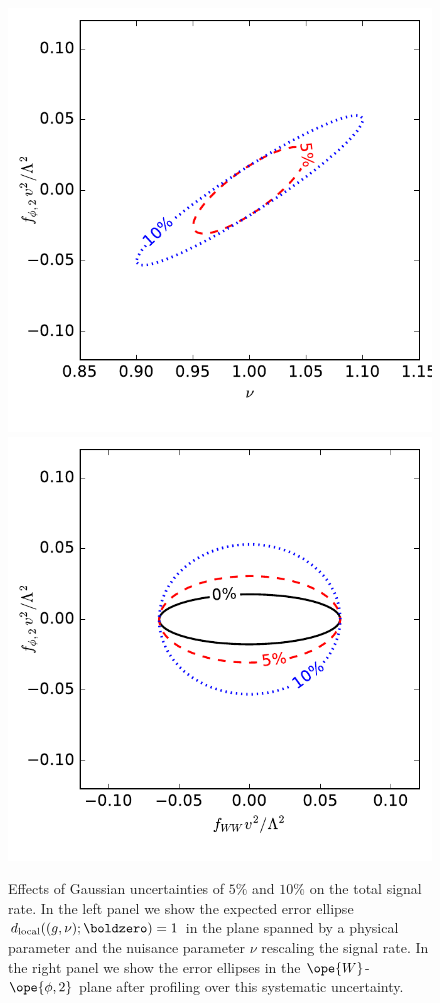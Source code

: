 \begin{figure}
  \centering
  \includegraphics[height=0.45 \textwidth]{fig/information/wbf_tautau_systematics_nuisance.pdf}
  \hspace*{0.05\textwidth}
  \includegraphics[height=0.45 \textwidth]{fig/information/wbf_tautau_systematics_profiled.pdf}
  \caption{Effects of Gaussian uncertainties of $5\%$ and $10\%$ on
    the total signal rate. In the left panel we show the expected
    error ellipse $d_{\text{local}}( (g,\nu) ; \boldzero) = 1$ in
    the plane spanned by a physical parameter and the nuisance
    parameter $\nu$ rescaling the signal rate. In the right panel we
    show the error ellipses in the $\ope{W}$-$\ope{\phi,2}$ plane
    after profiling over this systematic uncertainty.}
  \label{fig:information_wbf_tautau_systematics}
\end{figure}

